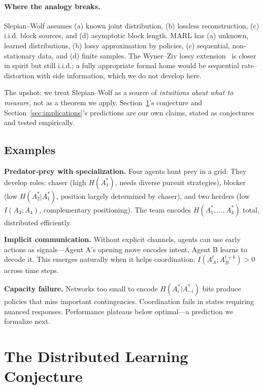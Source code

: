 \documentclass[10pt, letterpaper]{article}
\begin{document}
\paragraph{Where the analogy breaks.} Slepian--Wolf assumes (a) known joint distribution, (b) lossless reconstruction, (c) i.i.d. block sources, and (d) asymptotic block length. MARL has (a) unknown, learned distributions, (b) lossy approximation by policies, (c) sequential, non-stationary data, and (d) finite samples. The Wyner--Ziv lossy extension~\cite{wyner1976} is closer in spirit but still i.i.d.; a fully appropriate formal home would be sequential rate--distortion with side information, which we do not develop here.

The upshot: we treat Slepian--Wolf as a source of \emph{intuitions about what to measure}, not as a theorem we apply. Section~\ref{sec:conjecture}'s conjecture and Section~\ref{sec:implications}'s predictions are our own claims, stated as conjectures and tested empirically.

\subsection{Examples}

\textbf{Predator-prey with specialization.} Four agents hunt prey in a grid. They develop roles: chaser (high $H(A_1^*)$, needs diverse pursuit strategies), blocker (low $H(A_2^*|A_1^*)$, position largely determined by chaser), and two herders (low $I(A_3; A_4)$, complementary positioning). The team encodes $H(A_1^*, \ldots, A_4^*)$ total, distributed efficiently.

\textbf{Implicit communication.} Without explicit channels, agents can use early actions as signals---Agent A's opening move encodes intent, Agent B learns to decode it. This emerges naturally when it helps coordination: $I(A_A^t; A_B^{t+k}) > 0$ across time steps.

\textbf{Capacity failure.} Networks too small to encode $H(A_i^*|A_{-i}^*)$ bits produce policies that miss important contingencies. Coordination fails in states requiring nuanced responses. Performance plateaus below optimal---a prediction we formalize next.

\section{The Distributed Learning Conjecture}
\label{sec:conjecture}
\end{document}
